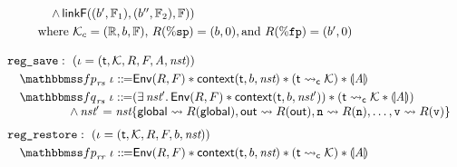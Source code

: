 \begin{figure}[!t]
\[\begin{array}{l}
\begin{array}{lcl}
                    & & \quad
                    \, \land \, 
                    \linkF((\block', \hWstk_1), (\block'', \hWstk_2), \hWstk)
                ) \\
                \\[-9pt]
                \multicolumn{3}{l}
                {
                    \qquad 
                    \text{where} \ 
                    \hthrdlocalst_c = (\hRfile, \block, \hWstk), \, 
                    \RFile(\spreg) = (\block, 0), \text{and } 
                    \RFile(\fpreg) = (\block', 0)
                }
            \end{array} 
            \\
            \\
            \texttt{reg\_save}: \ (\lgvl = (\thrdid, \hthrdlocalst, \RFile, \Wstack, 
            \primcom, \nst)) \\
            \\[-9pt]
            \quad 
            \relspecpre_{\textit{rs}} \ \lgvl \define 
            \Env{\RFile, \Wstack} \sepstar 
            \context{\thrdid, \block, \nst} \sepstar 
            (\astCurCont{\thrdid}{\hthrdlocalst}) \sepstar \safePrimAst{\primcom} \\
            \\[-9pt]
            \quad
            \relspecpost_{\textit{rs}} \ \lgvl \define 
            (\exists \, \nst'. \, \Env{\RFile, \Wstack} \sepstar
            \relcontext{\thrdid}{\block}{\nst'}) \sepstar 
            (\astCurCont{\thrdid}{\hthrdlocalst} \sepstar \safePrimAst{\primcom}) \\
            \hspace*{5em}
            \, \land \, 
            \nst' = \nst\{ \globalRN \rightsquigarrow \RFile(\globalRN), 
                \outRN \rightsquigarrow \RFile(\outRN), 
                \regn \rightsquigarrow \RFile(\regn), \dots, 
                \regv \rightsquigarrow \RFile(\regv) \}  \\
            \\[-5pt]
            \texttt{reg\_restore}: \ (\lgvl = (\thrdid, \hthrdlocalst, \RFile, \Wstack, 
                \block, \nst)) \\
            \\[-9pt]
            \quad
            \relspecpre_{\textit{rr}} \ \lgvl \define \Env{\RFile, \Wstack} \sepstar 
            \relcontext{\thrdid}{\block}{\nst} \sepstar 
            (\astCurCont{\thrdid}{\hthrdlocalst}) \sepstar \safePrimAst{\primcom} \\

\end{array}\]
\end{figure}
